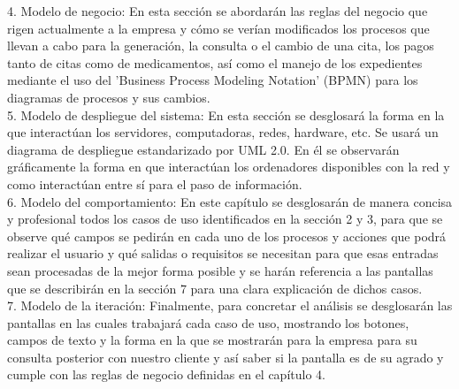 4. Modelo de negocio: En esta sección se abordarán las reglas del negocio que rigen actualmente a la empresa y cómo se verían modificados los procesos que llevan a cabo para la generación, la consulta o el cambio de una cita, los pagos tanto de citas como de medicamentos, así como el manejo de los expedientes mediante el uso del 'Business Process Modeling Notation' (BPMN) para los diagramas de procesos y sus cambios. \\

5. Modelo de despliegue del sistema: En esta sección se desglosará la forma en la que interactúan los servidores, computadoras, redes, hardware, etc. Se usará un diagrama de despliegue estandarizado por UML 2.0. En él se observarán gráficamente la forma en que interactúan los ordenadores disponibles con la red y como interactúan entre sí para el paso de información. \\

6. Modelo del comportamiento: En este capítulo se desglosarán de manera concisa y profesional todos los casos de uso identificados en la sección 2 y 3, para que se observe qué campos se pedirán en cada uno de los procesos y acciones que podrá realizar el usuario y qué salidas o requisitos se necesitan para que esas entradas sean procesadas de la mejor forma posible y se harán referencia a las pantallas que se describirán en la sección 7 para una clara explicación de dichos casos. \\

7. Modelo de la iteración: Finalmente, para concretar el análisis se desglosarán las pantallas en las cuales trabajará cada caso de uso, mostrando los botones, campos de texto y la forma en la que se mostrarán para la empresa para su consulta posterior con nuestro cliente y así saber si la pantalla es de su agrado y cumple con las reglas de negocio definidas en el capítulo 4. 